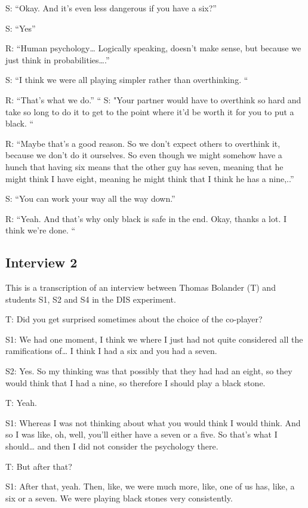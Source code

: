 \documentclass[a4paper,superscriptaddress,nofootinbib]{revtex4}
\begin{document}
S: “Okay. And it's even less dangerous if you have a six?”

S: “Yes”

R: “Human psychology… Logically speaking, doesn't make sense, but because we just think in probabilities….”

S: “I think we were all playing simpler rather than overthinking. “

R: “That's what we do.” 
“
S: "Your partner would have to overthink so hard and take so long to do it to get to the point where it'd be worth it for you to put a black. “

R: “Maybe that's a good reason. So we don't expect others to overthink it, because we don't do it ourselves. So even though we might somehow have a hunch that having six means that the other guy has seven, meaning that he might think I have eight, meaning he might think that I think he has a nine,..”

S: “You can work your way all the way down.”

R: “Yeah. And that's why only black is safe in the end. Okay, thanks a lot. I think we're done. “




\subsection*{Interview 2}
This is a transcription of an interview between Thomas Bolander (T) and students S1, S2 and S4 in the DIS experiment.

\medskip
T: Did you get surprised sometimes about the choice of the co-player? 

S1: We had one moment, I think we where I just had not quite considered all the ramifications of… I think I had a six and you had a seven. 

S2: Yes. So my thinking was that possibly that they had had an eight, so they would think that I had a nine, so therefore I should play a black stone.

T: Yeah. 

S1: Whereas I was not thinking about what you would think I would think. And so I was like, oh, well, you'll either have a seven or a five. So that's what I should… and then I did not consider the psychology there.

T: But after that?

S1: After that, yeah. Then, like, we were much more, like, one of us has, like, a six or a seven. We were playing black stones very consistently. 
\end{document}

